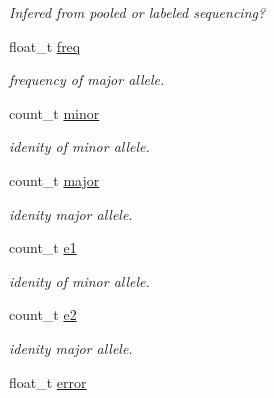 \begin{DoxyCompactItemize}
\begin{DoxyCompactList}\small\item\em Infered from pooled or labeled sequencing? \end{DoxyCompactList}\item 
\hypertarget{classallele__stat_aa1b30be6ca2ced00da992dc230336757}{float\-\_\-t \hyperlink{classallele__stat_aa1b30be6ca2ced00da992dc230336757}{freq}}\label{classallele__stat_aa1b30be6ca2ced00da992dc230336757}

\begin{DoxyCompactList}\small\item\em frequency of major allele. \end{DoxyCompactList}\item 
\hypertarget{classallele__stat_a36f0ec78b3840e105ce99cedfe1aed58}{count\-\_\-t \hyperlink{classallele__stat_a36f0ec78b3840e105ce99cedfe1aed58}{minor}}\label{classallele__stat_a36f0ec78b3840e105ce99cedfe1aed58}

\begin{DoxyCompactList}\small\item\em idenity of minor allele. \end{DoxyCompactList}\item 
\hypertarget{classallele__stat_accb8b46cf5789cfca74608a807a3c6f0}{count\-\_\-t \hyperlink{classallele__stat_accb8b46cf5789cfca74608a807a3c6f0}{major}}\label{classallele__stat_accb8b46cf5789cfca74608a807a3c6f0}

\begin{DoxyCompactList}\small\item\em idenity major allele. \end{DoxyCompactList}\item 
\hypertarget{classallele__stat_a9206ac0d42fe383c24369a489fa922a5}{count\-\_\-t \hyperlink{classallele__stat_a9206ac0d42fe383c24369a489fa922a5}{e1}}\label{classallele__stat_a9206ac0d42fe383c24369a489fa922a5}

\begin{DoxyCompactList}\small\item\em idenity of minor allele. \end{DoxyCompactList}\item 
\hypertarget{classallele__stat_a13d548f1bf5ba90007d8141d9ad66c40}{count\-\_\-t \hyperlink{classallele__stat_a13d548f1bf5ba90007d8141d9ad66c40}{e2}}\label{classallele__stat_a13d548f1bf5ba90007d8141d9ad66c40}

\begin{DoxyCompactList}\small\item\em idenity major allele. \end{DoxyCompactList}\item 
\hypertarget{classallele__stat_adbc434a2d1899c71af8fca3d3a8a6cb9}{float\-\_\-t \hyperlink{classallele__stat_adbc434a2d1899c71af8fca3d3a8a6cb9}{error}}\label{classallele__stat_adbc434a2d1899c71af8fca3d3a8a6cb9}


\end{DoxyCompactItemize}
